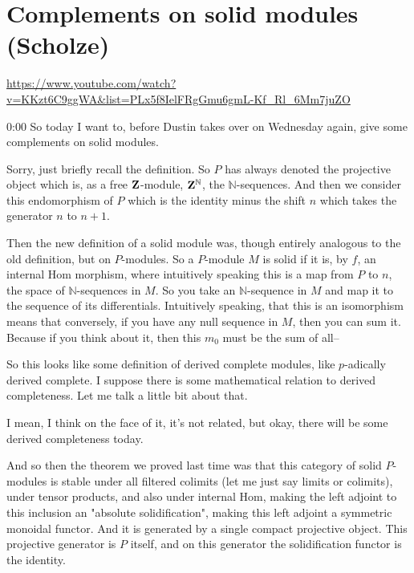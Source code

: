 
\section{\ufs Complements on solid modules (Scholze)}

\url{https://www.youtube.com/watch?v=KKzt6C9ggWA&list=PLx5f8IelFRgGmu6gmL-Kf_Rl_6Mm7juZO}
\renewcommand{\yt}[2]{\href{https://www.youtube.com/watch?v=KKzt6C9ggWA&list=PLx5f8IelFRgGmu6gmL-Kf_Rl_6Mm7juZO&t=#1}{#2}}
\vspace{1em}

\begin{unfinished}{0:00}
So today I want to, before Dustin takes over on Wednesday again, give some complements on solid modules.

Sorry, just briefly recall the definition. So $P$ has always denoted the projective object which is, as a free $\mathbf Z$-module, $\mathbf Z^{\mathbb{N}}$, the $\mathbb{N}$-sequences. And then we consider this endomorphism of $P$ which is the identity minus the shift $n$ which takes the generator $n$ to $n+1$.

Then the new definition of a solid module was, though entirely analogous to the old definition, but on $P$-modules. So a $P$-module $M$ is solid if it is, by $f$, an internal $\mathrm{Hom}$ morphism, where intuitively speaking this is a map from $P$ to $n$, the space of $\mathbb{N}$-sequences in $M$. So you take an $\mathbb{N}$-sequence in $M$ and map it to the sequence of its differentials. Intuitively speaking, that this is an isomorphism means that conversely, if you have any null sequence in $M$, then you can sum it. Because if you think about it, then this $m_0$ must be the sum of all--

So this looks like some definition of derived complete modules, like $p$-adically derived complete. I suppose there is some mathematical relation to derived completeness. Let me talk a little bit about that.

I mean, I think on the face of it, it's not related, but okay, there will be some derived completeness today.

And so then the theorem we proved last time was that this category of solid $P$-modules is stable under all filtered colimits (let me just say limits or colimits), under tensor products, and also under internal $\mathrm{Hom}$, making the left adjoint to this inclusion an "absolute solidification", making this left adjoint a symmetric monoidal functor. And it is generated by a single compact projective object. This projective generator is $P$ itself, and on this generator the solidification functor is the identity.


\end{unfinished}
